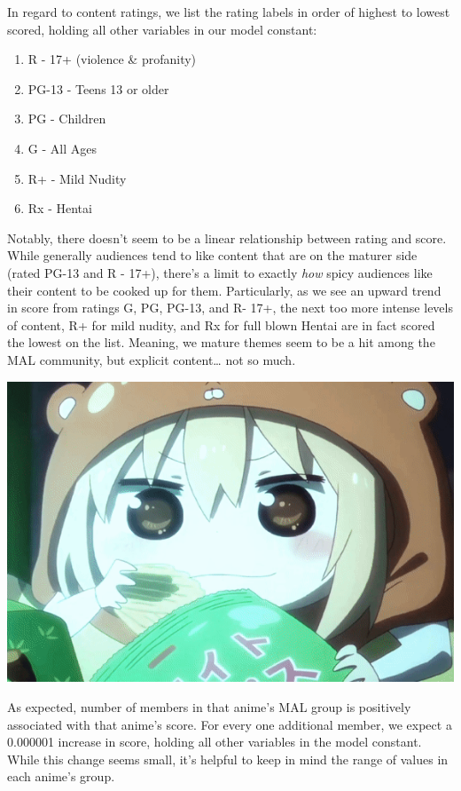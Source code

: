 \documentclass[
]{article}
\begin{document}
In regard to content ratings, we list the rating labels in order of
highest to lowest scored, holding all other variables in our model
constant:

\begin{enumerate}
\def\labelenumi{\arabic{enumi})}
\item
  R - 17+ (violence \& profanity)
\item
  PG-13 - Teens 13 or older
\item
  PG - Children
\item
  G - All Ages
\item
  R+ - Mild Nudity
\item
  Rx - Hentai
\end{enumerate}

Notably, there doesn't seem to be a linear relationship between rating
and score. While generally audiences tend to like content that are on
the maturer side (rated PG-13 and R - 17+), there's a limit to exactly
\emph{how} spicy audiences like their content to be cooked up for them.
Particularly, as we see an upward trend in score from ratings G, PG,
PG-13, and R- 17+, the next too more intense levels of content, R+ for
mild nudity, and Rx for full blown Hentai are in fact scored the lowest
on the list. Meaning, we mature themes seem to be a hit among the MAL
community, but explicit content\ldots{} not so much.

\includegraphics{./img/watch_tv.gif}

As expected, number of members in that anime's MAL group is positively
associated with that anime's score. For every one additional member, we
expect a 0.000001 increase in score, holding all other variables in the
model constant. While this change seems small, it's helpful to keep in
mind the range of values in each anime's group.
\end{document}
